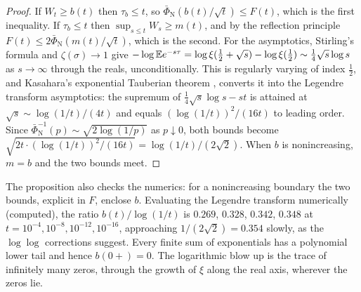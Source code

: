 \begin{proof}
If $W_t\ge b(t)$ then $\tau_b\le t$, so $\bar\Phi_{\mathrm N}(b(t)/\sqrt t)\le F(t)$, which is the first inequality. If $\tau_b\le t$ then $\sup_{s\le t}W_s\ge m(t)$, and by the reflection principle $F(t)\le2\bar\Phi_{\mathrm N}(m(t)/\sqrt t)$, which is the second. For the asymptotics, Stirling's formula and $\zeta(\sigma)\to1$ give $-\log\mathbb{E} e^{-s\tau}=\log\xi(\frac12+\sqrt s)-\log\xi(\frac12)\sim\frac14\sqrt s\log s$ as $s\to\infty$ through the reals, unconditionally. This is regularly varying of index $\frac12$, and Kasahara's exponential Tauberian theorem \cite{Kasahara78}, \cite[Section 4.12]{BGT87} %
converts it into the Legendre transform asymptotics: the supremum of $\frac14\sqrt s\log s-st$ is attained at $\sqrt s\sim\log(1/t)/(4t)$ and equals $(\log(1/t))^2/(16t)$ to leading order. Since $\bar\Phi_{\mathrm N}^{-1}(p)\sim\sqrt{2\log(1/p)}$ as $p\downarrow0$, both bounds become $\sqrt{2t\cdot(\log(1/t))^2/(16t)}=\log(1/t)/(2\sqrt2)$. When $b$ is nonincreasing, $m=b$ and the two bounds meet.
\end{proof}

The proposition also checks the numerics: for a nonincreasing boundary the two bounds, explicit in $F$, enclose $b$. Evaluating the Legendre transform numerically (computed), the ratio $b(t)/\log(1/t)$ is $0.269$, $0.328$, $0.342$, $0.348$ at $t=10^{-4},10^{-8},10^{-12},10^{-16}$, approaching $1/(2\sqrt2)=0.354$ slowly, as the $\log\log$ corrections suggest. Every finite sum of exponentials has a polynomial lower tail and hence $b(0+)=0$. The logarithmic blow up is the trace of infinitely many zeros, through the growth of $\xi$ along the real axis, wherever the zeros lie.

